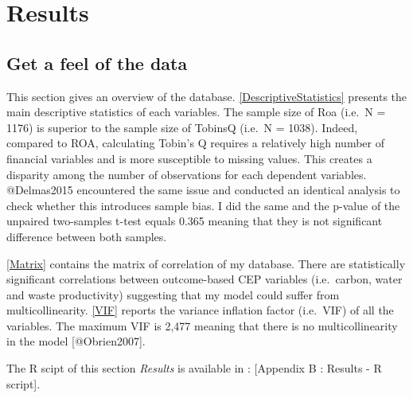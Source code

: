 \documentclass[]{article}
\title{}
\author{}
\date{}
\begin{document}
\section{Results}\label{results}

\subsection{Get a feel of the data}\label{get-a-feel-of-the-data}

This section gives an overview of the database.
\autoref{DescriptiveStatistics} presents the main descriptive statistics
of each variables. The sample size of Roa (i.e.~N = 1176) is superior to
the sample size of TobinsQ (i.e.~N = 1038). Indeed, compared to ROA,
calculating Tobin's Q requires a relatively high number of financial
variables and is more susceptible to missing values. This creates a
disparity among the number of observations for each dependent variables.
@Delmas2015 encountered the same issue and conducted an identical
analysis to check whether this introduces sample bias. I did the same
and the p-value of the unpaired two-samples t-test equals 0.365 meaning
that they is not significant difference between both samples.

\autoref{Matrix} contains the matrix of correlation of my database.
There are statistically significant correlations between outcome-based
CEP variables (i.e.~carbon, water and waste productivity) suggesting
that my model could suffer from multicollinearity. \autoref{VIF} reports
the variance inflation factor (i.e.~VIF) of all the variables. The
maximum VIF is 2,477 meaning that there is no multicollinearity in the
model {[}@Obrien2007{]}.

The R scipt of this section \emph{Results} is available in : {[}Appendix
B : Results - R script{]}.
\end{document}
